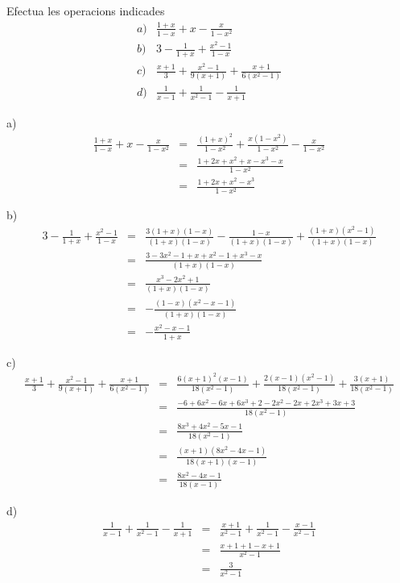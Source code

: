\begin{exercici}
Efectua les operacions indicades\[
\begin{array}{ll}
a) & \frac{1+x}{1-x}+x-\frac{x}{1-x^{2}} \\
b) & 3-\frac{1}{1+x}+\frac{x^{2}-1}{1-x} \\
c) & \frac{x+1}{3}+\frac{x^{2}-1}{9(x+1)}+\frac{x+1}{6(x^{2}-1)} \\
d) & \frac{1}{x-1}+\frac{1}{x^{2}-1}-\frac{1}{x+1}\end{array}\]
\end{exercici}

\begin{solucio}
a)\begin{eqnarray*}
\frac{1+x}{1-x}+x-\frac{x}{1-x^{2}} &=&\frac{(1+x)^{2}}{1-x^{2}}+\frac{x(1-x^{2})}{1-x^{2}}-\frac{x}{1-x^{2}} \\
&=&\frac{1+2x+x^{2}+x-x^{3}-x}{1-x^{2}} \\
&=&\frac{1+2x+x^{2}-x^{3}}{1-x^{2}}
\end{eqnarray*}

b)\begin{eqnarray*}
3-\frac{1}{1+x}+\frac{x^{2}-1}{1-x} &=&\frac{3(1+x)(1-x)}{(1+x)(1-x)}-\frac{1-x}{(1+x)(1-x)}+\frac{(1+x)(x^{2}-1)}{(1+x)(1-x)} \\
&=&\frac{3-3x^{2}-1+x+x^{2}-1+x^{3}-x}{(1+x)(1-x)} \\
&=&\frac{x^{3}-2x^{2}+1}{(1+x)(1-x)} \\
&=&-\frac{(1-x)(x^{2}-x-1)}{(1+x)(1-x)} \\
&=&-\frac{x^{2}-x-1}{1+x}
\end{eqnarray*}

c)\begin{eqnarray*}
\frac{x+1}{3}+\frac{x^{2}-1}{9(x+1)}+\frac{x+1}{6(x^{2}-1)} &=&\frac{6(x+1)^{2}(x-1)}{18(x^{2}-1)}+\frac{2(x-1)(x^{2}-1)}{18(x^{2}-1)}+\frac{3(x+1)}{18(x^{2}-1)} \\
&=&\frac{-6+6x^{2}-6x+6x^{3}+2-2x^{2}-2x+2x^{3}+3x+3}{18(x^{2}-1)} \\
&=&\frac{8x^{3}+4x^{2}-5x-1}{18(x^{2}-1)} \\
&=&\frac{(x+1)(8x^{2}-4x-1)}{18(x+1)(x-1)} \\
&=&\frac{8x^{2}-4x-1}{18(x-1)}
\end{eqnarray*}

d)\begin{eqnarray*}
\frac{1}{x-1}+\frac{1}{x^{2}-1}-\frac{1}{x+1} &=&\frac{x+1}{x^{2}-1}+\frac{1}{x^{2}-1}-\frac{x-1}{x^{2}-1} \\
&=&\frac{x+1+1-x+1}{x^{2}-1} \\
&=&\frac{3}{x^{2}-1}
\end{eqnarray*}
\end{solucio}


